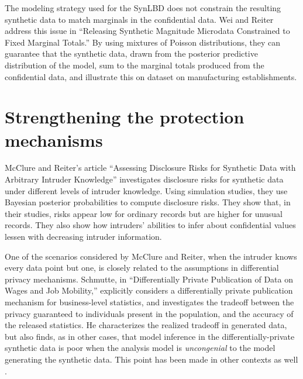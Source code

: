 \documentclass[article,letter]{llncs}
\begin{document}
The modeling strategy used for the \ac{SynLBD} does not constrain the resulting synthetic data to match marginals in the confidential data. Wei and Reiter address this issue in ``Releasing Synthetic Magnitude Microdata Constrained to Fixed Marginal Totals.'' By using mixtures of Poisson distributions,  they can guarantee that the synthetic data, drawn from the posterior predictive distribution of the model, sum to the marginal totals produced from the confidential data, and illustrate this on dataset on manufacturing establishments.


\section{Strengthening the protection mechanisms}
McClure and Reiter's article ``Assessing Disclosure Risks for Synthetic Data with Arbitrary Intruder Knowledge'' investigates disclosure risks for synthetic data under different levels of intruder knowledge.  Using simulation studies, they use Bayesian posterior probabilities to compute disclosure risks.  They show that, in their studies, risks appear low for ordinary records but are higher for unusual records.  They also show how intruders' abilities to infer about confidential values lessen with decreasing intruder information. 

One of the scenarios considered by McClure and Reiter, when the intruder knows every data point but one, is closely related to the assumptions in differential privacy mechanisms.
Schmutte, in ``Differentially Private Publication of Data
on Wages and Job Mobility,'' explicitly considers a differentially private publication mechanism for business-level statistics, and investigates the tradeoff between the privacy guaranteed to individuals present in the population, and the accuracy of the released statistics. He characterizes the realized tradeoff in generated data, but also finds, as in other cases, that model inference in the differentially-private synthetic data is poor when the analysis model is \emph{uncongenial} \cite{Meng1994} to the model generating the synthetic data. This point has been made in other contexts as well \cite{AbowdSchmutte_BPEA2015}.
\end{document}
